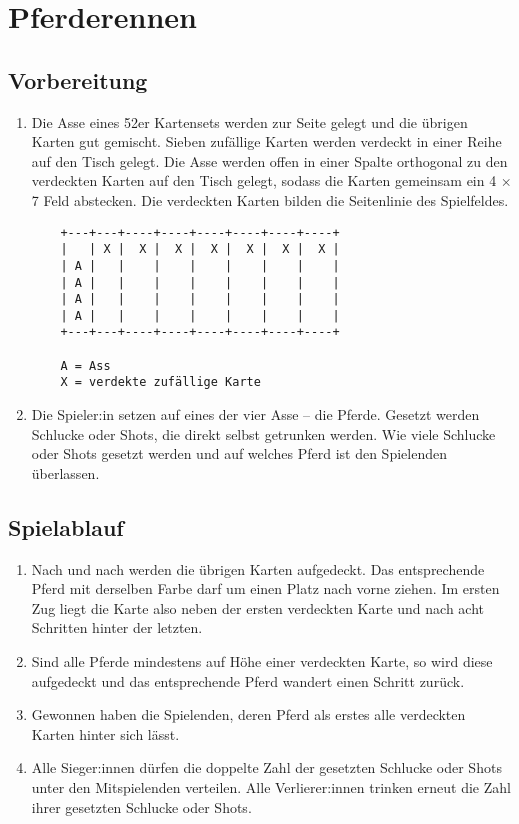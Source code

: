 \chapter{Pferderennen}
\section{Vorbereitung}
\begin{enumerate}[label={(\arabic*)}]    
    \item
    Die Asse eines 52er Kartensets werden zur Seite gelegt und die übrigen Karten gut gemischt.
    Sieben zufällige Karten werden verdeckt in einer Reihe auf den Tisch gelegt.
    Die Asse werden offen in einer Spalte orthogonal zu den verdeckten Karten auf den Tisch gelegt, sodass die Karten gemeinsam ein 4 \begin{math}\times\end{math} 7 Feld abstecken.
    Die verdeckten Karten bilden die Seitenlinie des Spielfeldes.
    \begin{verbatim}
    +---+---+----+----+----+----+----+----+
    |   | X |  X |  X |  X |  X |  X |  X |
    | A |   |    |    |    |    |    |    |
    | A |   |    |    |    |    |    |    |
    | A |   |    |    |    |    |    |    |
    | A |   |    |    |    |    |    |    |
    +---+---+----+----+----+----+----+----+
    
    A = Ass
    X = verdekte zufällige Karte
    \end{verbatim}

    \item
    Die Spieler:in setzen auf eines der vier Asse – die \glqq{}Pferde\grqq{}.
    Gesetzt werden Schlucke oder Shots, die direkt selbst getrunken werden.
    Wie viele Schlucke oder Shots gesetzt werden und auf welches Pferd ist den Spielenden überlassen.
\end{enumerate}

\section{Spielablauf}
\begin{enumerate}[label={(\arabic*)}]
    \item
    Nach und nach werden die übrigen Karten aufgedeckt.
    Das entsprechende Pferd mit derselben Farbe darf um einen Platz nach vorne ziehen.
    Im ersten Zug liegt die Karte also neben der ersten verdeckten Karte und nach acht Schritten hinter der letzten.

    \item
    Sind alle Pferde mindestens auf Höhe einer verdeckten Karte, so wird diese aufgedeckt und das entsprechende Pferd wandert einen Schritt zurück.

    \item
    Gewonnen haben die Spielenden, deren Pferd als erstes alle verdeckten Karten hinter sich lässt.

    \item
    Alle Sieger:innen dürfen die doppelte Zahl der gesetzten Schlucke oder Shots unter den Mitspielenden verteilen.
    Alle Verlierer:innen trinken erneut die Zahl ihrer gesetzten Schlucke oder Shots.
\end{enumerate}

